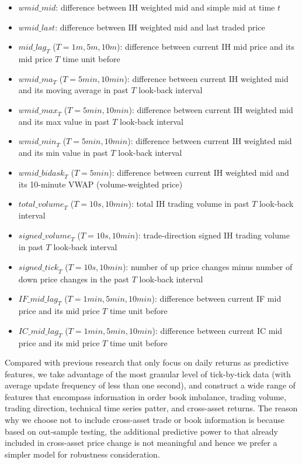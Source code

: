 \documentclass{article}
\begin{document}
\begin{itemize}
\setlength\itemsep{0.1em}
\item ${wmid\_mid}$: difference between IH weighted mid and simple mid at time $t$
\item ${wmid\_last}$: difference between IH weighted mid and last traded price
\item ${mid\_lag}_T$ ($T=1m, 5m, 10m$): difference between current IH mid price and its mid price $T$ time unit before
\item ${wmid\_ma}_T$ ($T=5min, 10min$): difference between current IH weighted mid and its moving average in past $T$ look-back interval
\item ${wmid\_max}_T$ ($T=5min, 10min$): difference between current IH weighted mid and its max value in past $T$ look-back interval
\item ${wmid\_min}_T$ ($T=5min, 10min$): difference between current IH weighted mid and its min value in past $T$ look-back interval
\item ${wmid\_bidask}_T$ ($T=5min$): difference between current IH weighted mid and its 10-minute VWAP (volume-weighted price)
\item ${total\_volume}_T$ ($T=10s, 10min$): total IH trading volume in past $T$ look-back interval
\item ${signed\_volume}_T$ ($T=10s, 10min$): trade-direction signed IH trading volume in past $T$ look-back interval
\item ${signed\_tick}_T$ ($T=10s, 10min$): number of up price changes minus number of down price changes in the past $T$ look-back interval
\item ${IF\_mid\_lag}_T$ ($T=1min, 5min, 10min$): difference between current IF mid price and its mid price $T$ time unit before
\item ${IC\_mid\_lag}_T$ ($T=1min, 5min, 10min$): difference between current IC mid price and its mid price $T$ time unit before
\end{itemize}

Compared with previous research that only focus on daily returns as predictive features, we take advantage of the most granular level of tick-by-tick data (with average update frequency of less than one second), and construct a wide range of features that encompass information in order book imbalance, trading volume, trading direction, technical time series patter, and cross-asset returns. The reason why we choose not to include cross-asset trade or book information is because based on out-sample testing, the additional predictive power to that already included in cross-asset price change is not meaningful and hence we prefer a simpler model for robustness consideration.
\end{document}
